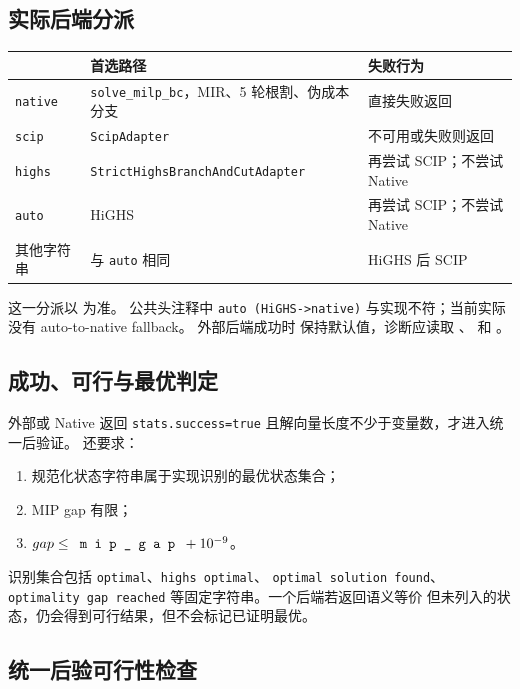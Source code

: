 \subsection{实际后端分派}

\begin{center}\small
\begin{tabular}{@{}L{2.5cm}L{6.0cm}L{6.0cm}@{}}
\toprule
{} & 首选路径 & 失败行为\\
\midrule
\texttt{native} & \texttt{solve\_milp\_bc}，MIR、5 轮根割、伪成本分支 & 直接失败返回\\
\texttt{scip} & \texttt{ScipAdapter} & 不可用或失败则返回\\
\texttt{highs} & \texttt{StrictHighsBranchAndCutAdapter} & 再尝试 SCIP；不尝试 Native\\
\texttt{auto} & HiGHS & 再尝试 SCIP；不尝试 Native\\
其他字符串 & 与 \texttt{auto} 相同 & HiGHS 后 SCIP\\
\bottomrule
\end{tabular}
\end{center}

这一分派以  为准。
公共头注释中 \texttt{auto (HiGHS->native)} 与实现不符；当前实际没有 auto-to-native fallback。
外部后端成功时  保持默认值，诊断应读取 、
 和 。

\subsection{成功、可行与最优判定}

外部或 Native 返回 \texttt{stats.success=true} 且解向量长度不少于变量数，才进入统一后验证。
 还要求：
\begin{enumerate}
  \item 规范化状态字符串属于实现识别的最优状态集合；
  \item MIP gap 有限；
  \item $gap\le\fld{mip\_gap}+10^{-9}$。
\end{enumerate}
识别集合包括 \texttt{optimal}、\texttt{highs optimal}、
\texttt{optimal solution found}、\texttt{optimality gap reached} 等固定字符串。一个后端若返回语义等价
但未列入的状态，仍会得到可行结果，但不会标记已证明最优。

\subsection{统一后验可行性检查}

